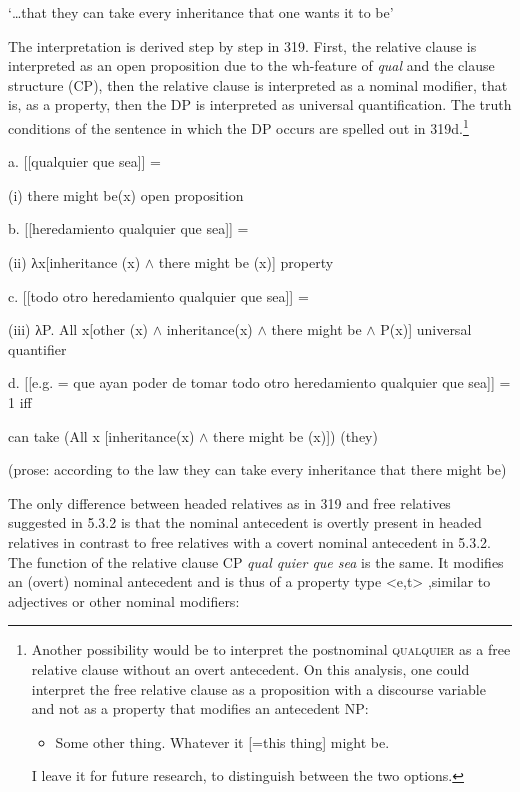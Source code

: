   ‘…that they can take every inheritance that one wants it to be’ 

The interpretation is derived step by step in 319. First, the relative clause is interpreted as an open proposition due to the wh-feature of \textit{qual} and the clause structure (CP), then the relative clause is interpreted as a nominal modifier, that is, as a property, then the DP is interpreted as universal quantification. The truth conditions of the sentence in which the DP occurs are spelled out in 319d.\footnote{{Another possibility would be to interpret the postnominal} {\textsc{qualquier}} {as a free relative clause without an overt antecedent. On this analysis, one could interpret the free relative clause as a proposition with a discourse variable and not as a property that modifies an antecedent NP:}

\begin{itemize}
\item  {Some other thing. Whatever it [=this thing] might be.}
\end{itemize}
{I leave it for future research, to distinguish between the two options.} }

  a.  [[qualquier que sea]] =  

    (i) there might be(x)  open proposition

  b.  [[heredamiento qualquier que sea]] =  

    (ii) λx[inheritance (x) ${\wedge}$ there might be (x)]  property

  c.  [[todo otro heredamiento qualquier que sea]] =  

    (iii) λP. All x[other (x) ${\wedge}$ inheritance(x) ${\wedge}$ there might be ${\wedge}$ P(x)]  universal quantifier

  d.  [[e.g.  = que ayan poder de tomar todo otro heredamiento qualquier que sea]] = 1 iff  

    can take (All x [inheritance(x) ${\wedge}$ there might be (x)]) (they)  

    (prose: according to the law they can take every inheritance that there might be)

The only difference between headed relatives as in 319 and free relatives suggested in 5.3.2 is that the nominal antecedent is overtly present in headed relatives in contrast to free relatives with a covert nominal antecedent in 5.3.2. The function of the relative clause CP \textit{qual quier que sea} is the same. It modifies an (overt) nominal antecedent and is thus of a property type <e,t> ,similar to adjectives or other nominal modifiers: 

